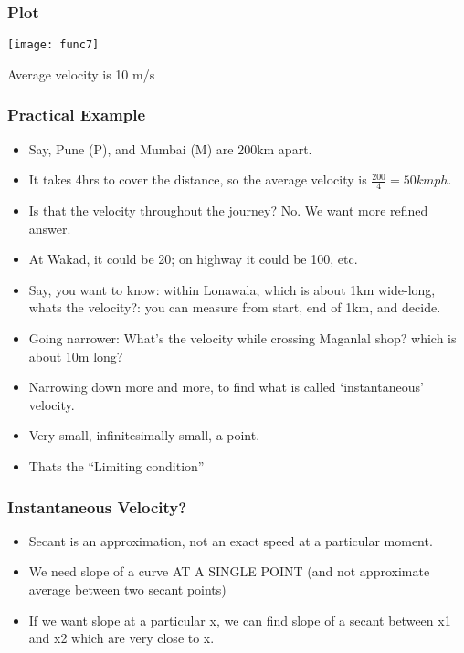  \begin{frame}[fragile]\frametitle{Plot}
\begin{center}
\texttt{[image: func7]}
\end{center}
Average velocity is 10 m/s
\end{frame}

 \begin{frame}[fragile]\frametitle{Practical Example}
\begin{itemize}
\item Say, Pune (P), and Mumbai (M) are 200km apart.
\item It takes 4hrs to cover the distance, so the average velocity is $\frac{200}{4} = 50kmph$.
\item Is that the velocity throughout the journey? No. We want more refined answer.
\item At Wakad, it could be 20; on highway it could be 100, etc.
\item Say, you want to know: within Lonawala, which is about 1km wide-long, whats the velocity?: you can measure from start, end of 1km, and decide.
\item Going narrower: What's the velocity while crossing Maganlal shop? which is about 10m long?
\item Narrowing down more and more, to find what is called `instantaneous' velocity.
\item Very small, infinitesimally small, a point.
\item Thats the ``Limiting condition''
\end{itemize}
\end{frame}


 \begin{frame}[fragile]\frametitle{Instantaneous Velocity?}
\begin{itemize}
\item Secant is an approximation, not an exact speed at a particular moment.
\item We need slope of a curve AT A SINGLE POINT (and not approximate average between two secant points)
\item If we want slope at a particular x, we can find slope of a secant between x1 and x2 which are very close to x.
\end{itemize}
\end{frame}

